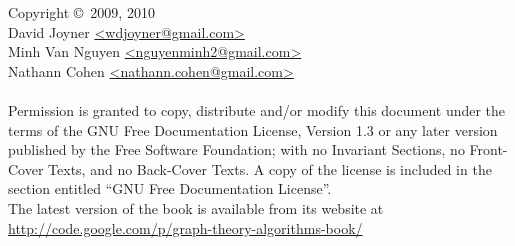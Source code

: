 \noindent Copyright \copyright\ 2009, 2010 \\
David Joyner \url{<wdjoyner@gmail.com>} \\
Minh Van Nguyen \url{<nguyenminh2@gmail.com>} \\
Nathann Cohen \url{<nathann.cohen@gmail.com>} \\\\
Permission is granted to copy, distribute and/or modify this document
under the terms of the GNU Free Documentation License, Version 1.3
or any later version published by the Free Software Foundation;
with no Invariant Sections, no Front-Cover Texts, and no
Back-Cover Texts. A copy of the license is included in the section
entitled ``GNU Free Documentation License''. \\

\noindent
The latest version of the book is available from its website at \\

\url{http://code.google.com/p/graph-theory-algorithms-book/}
